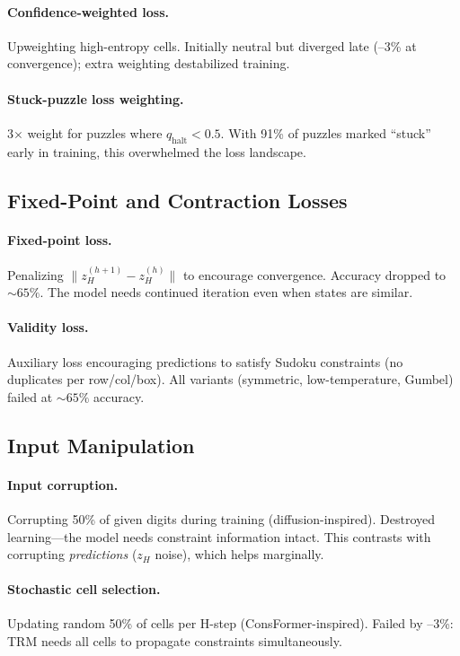 \paragraph{Confidence-weighted loss.} Upweighting high-entropy cells. Initially
neutral but diverged late (--3\% at convergence); extra weighting destabilized
training.

\paragraph{Stuck-puzzle loss weighting.} 3$\times$ weight for puzzles where
$q_\text{halt} < 0.5$. With 91\% of puzzles marked ``stuck'' early in training,
this overwhelmed the loss landscape.

\subsection{Fixed-Point and Contraction Losses}

\paragraph{Fixed-point loss.} Penalizing $\|z_H^{(h+1)} - z_H^{(h)}\|$ to
encourage convergence. Accuracy dropped to ${\sim}65\%$. The model needs
continued iteration even when states are similar.

\paragraph{Validity loss.} Auxiliary loss encouraging predictions to satisfy
Sudoku constraints (no duplicates per row/col/box). All variants (symmetric,
low-temperature, Gumbel) failed at ${\sim}65\%$ accuracy.

\subsection{Input Manipulation}

\paragraph{Input corruption.} Corrupting 50\% of given digits during training
(diffusion-inspired). Destroyed learning---the model needs constraint information
intact. This contrasts with corrupting \emph{predictions} ($z_H$ noise), which
helps marginally.

\paragraph{Stochastic cell selection.} Updating random 50\% of cells per H-step
(ConsFormer-inspired). Failed by --3\%: TRM needs all cells to propagate
constraints simultaneously.

